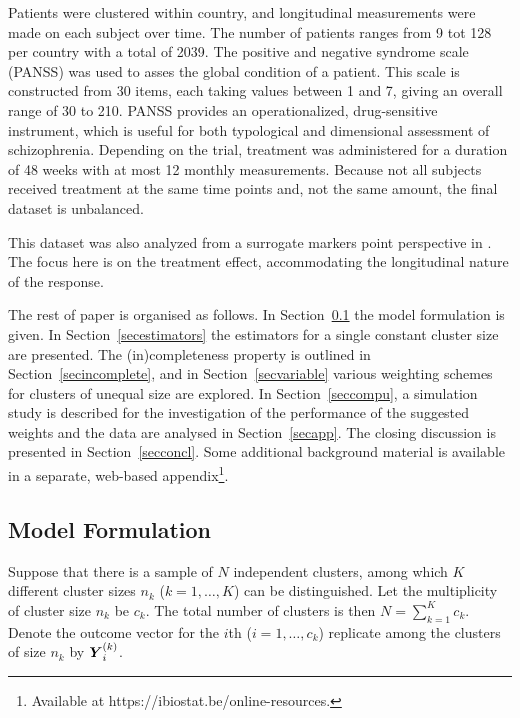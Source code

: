 \documentclass[11pt,a5paper,twoside]{book}
\newcommand{\BY}{\mbox{\boldmath $Y$}}
\let\rmarkdownfootnote\footnote%
\def\footnote{\protect\rmarkdownfootnote}
\begin{document}
Patients were clustered within country, and longitudinal measurements were made on each subject over time. The number of patients ranges from 9 tot 128 per country with a total of 2039.  The positive and negative syndrome scale (PANSS) was used to asses the global condition of a patient. This scale is constructed from 30 items, each taking values between 1 and 7, giving an overall range of 30 to 210. PANSS provides an operationalized, drug-sensitive instrument, which is useful for both typological and dimensional assessment of schizophrenia. Depending on the trial, treatment was administered for a duration of 48 weeks with at most 12 monthly measurements. Because not all subjects received treatment at the same time points and, not the same amount, the final dataset is unbalanced.

This dataset was also analyzed from a surrogate markers point perspective in \cite{alonso2004validation}. The focus here is on the treatment effect, accommodating the longitudinal nature of the response.

The rest of paper is organised as follows. In Section~\ref{secmodel} the model formulation is given. In Section~\ref{secestimators} the estimators for a single constant cluster size are presented. The (in)completeness property is outlined in Section~\ref{secincomplete}, and in Section~\ref{secvariable} various weighting schemes for clusters of unequal size are explored. In Section~\ref{seccompu}, a simulation study is described for the investigation of the performance of the suggested weights and the data are analysed in Section~\ref{secapp}. The closing discussion is presented in Section~\ref{secconcl}. Some additional background material is available in a separate, web-based appendix\footnote{Available at https://ibiostat.be/online-resources.}.

\subsection{Model Formulation}
\label{secmodel}

Suppose that there is a sample of $N$ independent clusters, among which $K$ different cluster sizes $n_{k}$ ($k=1,\dots,K$) can be distinguished. Let the multiplicity of cluster size $n_k$ be $c_k$. The total number of clusters is then $N=\sum_{k=1}^Kc_k$. Denote the outcome vector for the $i$th  ($i=1,\dots,c_k$) replicate among the clusters of size $n_k$ by $\BY_i^{(k)}$.
\end{document}
